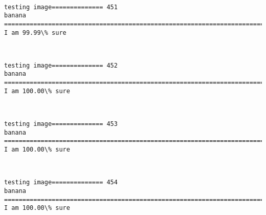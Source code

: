 \documentclass[11pt]{article}
\begin{document}
    \begin{center}
    \end{center}
    { \hspace*{\fill} \\}
    
    \begin{Verbatim}[commandchars=\\\{\}]
testing image============== 451
banana
============================================================================
I am 99.99\% sure

    \end{Verbatim}

    \begin{center}
    \end{center}
    { \hspace*{\fill} \\}
    
    \begin{Verbatim}[commandchars=\\\{\}]
testing image============== 452
banana
============================================================================
I am 100.00\% sure

    \end{Verbatim}

    \begin{center}
    \end{center}
    { \hspace*{\fill} \\}
    
    \begin{Verbatim}[commandchars=\\\{\}]
testing image============== 453
banana
============================================================================
I am 100.00\% sure

    \end{Verbatim}

    \begin{center}
    \end{center}
    { \hspace*{\fill} \\}
    
    \begin{Verbatim}[commandchars=\\\{\}]
testing image============== 454
banana
============================================================================
I am 100.00\% sure

    \end{Verbatim}
\end{document}
